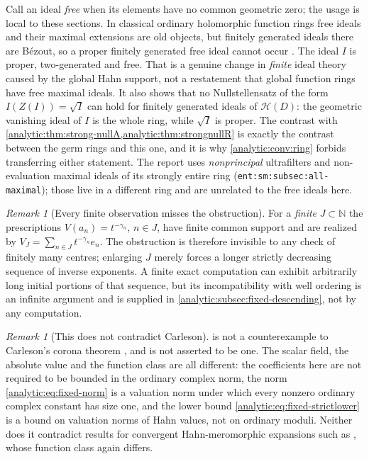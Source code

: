 \documentclass[11pt,letterpaper]{article}
\theoremstyle{definition}
\theoremstyle{remark}
\newtheorem{remark}[theorem]{Remark}
\newcommand{\N}{\mathbb N}
\newcommand{\HH}{\mathcal H}
\numberwithin{equation}{section}
\begin{document}
Call an ideal \emph{free} when its elements have no common geometric zero;
the usage is local to these sections. In classical ordinary holomorphic
function rings free ideals and their maximal extensions are old objects,
but finitely generated ideals there are B\'ezout, so a proper finitely
generated free ideal cannot occur \cite{Henriksen52,Henriksen53}. The ideal
$I$ is proper, two-generated and free. That is a genuine change in
\emph{finite} ideal theory caused by the global Hahn support, not a
restatement that global function rings have free maximal ideals. It also
shows that no Nullstellensatz of the form $I(Z(I))=\sqrt I$ can hold for
finitely generated ideals of $\HH(D)$: the geometric vanishing ideal of $I$
is the whole ring, while $\sqrt I$ is proper. The contrast with
\cref{analytic:thm:strong-nullA,analytic:thm:strongnullR} is exactly the
contrast between the germ rings and this one, and it is why
\cref{analytic:conv:ring} forbids transferring either statement.
The report  uses
\emph{nonprincipal} ultrafilters and non-evaluation maximal ideals of its
strongly entire ring (\texttt{ent:sm:subsec:all-maximal}); those live in a
different ring and are unrelated to the free ideals here.

\begin{remark}[Every finite observation misses the obstruction]
\label{analytic:rem:fixed-finite-observation}
For a \emph{finite} $J\subset\N$ the prescriptions $V(a_n)=t^{-\gamma_n}$,
$n\in J$, have finite common support and are realized by
$V_J=\sum_{n\in J}t^{-\gamma_n}e_n$. The obstruction is therefore invisible
to any check of finitely many centres; enlarging $J$ merely forces a longer
strictly decreasing sequence of inverse exponents. A finite exact
computation can exhibit arbitrarily long initial portions of that sequence,
but its incompatibility with well ordering is an infinite argument and is
supplied in \cref{analytic:subsec:fixed-descending}, not by any
computation.
\end{remark}

\begin{remark}[This does not contradict Carleson]
\label{analytic:rem:fixed-carleson}
 is not a counterexample to Carleson's
corona theorem \cite{Carleson}, and is not asserted to be one. The scalar
field, the absolute value and the function class are all different: the
coefficients here are not required to be bounded in the ordinary complex
norm, the norm \eqref{analytic:eq:fixed-norm} is a valuation norm under
which every nonzero ordinary complex constant has size one, and the lower
bound \eqref{analytic:eq:fixed-strictlower} is a bound on valuation norms
of Hahn values, not on ordinary moduli. Neither does it contradict results
for convergent Hahn-meromorphic expansions such as
\cite{MullerStrohmaier}, whose function class again differs.
\end{remark}
\end{document}
